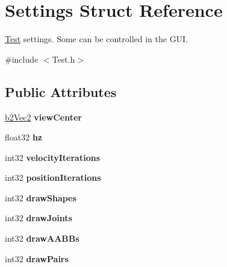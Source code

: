 \hypertarget{struct_settings}{\section{Settings Struct Reference}
\label{struct_settings}
}


\hyperlink{class_test}{Test} settings. Some can be controlled in the G\-U\-I.  




{\ttfamily \#include $<$Test.\-h$>$}

\subsection*{Public Attributes}
\begin{DoxyCompactItemize}
\item 
\hypertarget{struct_settings_a9f73ff7bfe24c0ec00f00637ad660afa}{\hyperlink{structb2_vec2}{b2\-Vec2} {\bfseries view\-Center}}\label{struct_settings_a9f73ff7bfe24c0ec00f00637ad660afa}

\item 
\hypertarget{struct_settings_a81f52938e3bfe4976755e77e940ca0e0}{float32 {\bfseries hz}}\label{struct_settings_a81f52938e3bfe4976755e77e940ca0e0}

\item 
\hypertarget{struct_settings_aef56168e9043d5a6f264a57fc0d0823a}{int32 {\bfseries velocity\-Iterations}}\label{struct_settings_aef56168e9043d5a6f264a57fc0d0823a}

\item 
\hypertarget{struct_settings_ae66b1defd12295dd5dce2362fcdad12f}{int32 {\bfseries position\-Iterations}}\label{struct_settings_ae66b1defd12295dd5dce2362fcdad12f}

\item 
\hypertarget{struct_settings_a4a8172dd21368b12a8442723f30914bf}{int32 {\bfseries draw\-Shapes}}\label{struct_settings_a4a8172dd21368b12a8442723f30914bf}

\item 
\hypertarget{struct_settings_ab03e798642ff7d039d5efa3e0d5e86cb}{int32 {\bfseries draw\-Joints}}\label{struct_settings_ab03e798642ff7d039d5efa3e0d5e86cb}

\item 
\hypertarget{struct_settings_a7ac6f10e3c8e20e8e9a7b7fa90f4b5b5}{int32 {\bfseries draw\-A\-A\-B\-Bs}}\label{struct_settings_a7ac6f10e3c8e20e8e9a7b7fa90f4b5b5}

\item 
\hypertarget{struct_settings_a393ea9824e615323134a9f8514d51ef7}{int32 {\bfseries draw\-Pairs}}\label{struct_settings_a393ea9824e615323134a9f8514d51ef7}


\end{DoxyCompactItemize}
